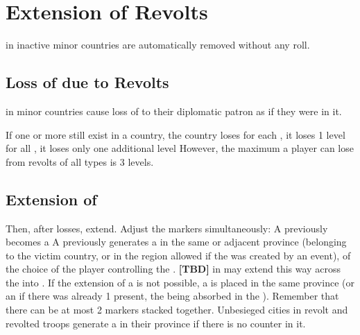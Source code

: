 \section{Extension of Revolts}\label{chRedep:Revolts}

\aparag \REVOLT in inactive minor countries are automatically removed without
any roll.


\subsection{Loss of \STAB due to Revolts}
\label{chRedep:Revolts Stability}
\aparag [TBD] \REVOLT in minor countries cause loss of \STAB to their
diplomatic patron as if they were in it.

\aparag If one or more \REVOLT still exist in a country, the country loses
\STAB
\bparag for each \REVOLT\faceplus, it loses 1 \STAB level
\bparag for all \REVOLT\facemoins, it loses only one additional \STAB level
\aparag However, the maximum a player can lose from revolts of all types is 3
\STAB levels.


\subsection{Extension of \REVOLT}
\label{chRedep:Extension Revolts}
\aparag Then, after \STAB losses, \REVOLT extend. Adjust the \REVOLT markers
simultaneously:
\bparag A previously \REVOLT\facemoins becomes a \REVOLT\faceplus
\bparag A previously \REVOLT\faceplus generates a \REVOLT\facemoins in the
same or adjacent province (belonging to the victim country, or in the region
allowed if the \REVOLT was created by an event), of the choice of the player
controlling the \REVOLT.
\bparag \textbf{[TBD]} \REVOLT in \regionIrlande may extend this way across
the \seazoneMan into \ANG.
\bparag If the extension of a \REVOLT\faceplus is not possible, a \REVOLT \LD
is placed in the same province (or an \ARMY\facemoins if there was already 1
\REVOLT \LD present, the \LD being absorbed in the \ARMY).
\bparag Remember that there can be at most 2 \REVOLT markers stacked together.
\bparag Unbesieged cities in revolt and revolted troops generate a
\REVOLT\facemoins in their province if there is no \REVOLT counter in it.

